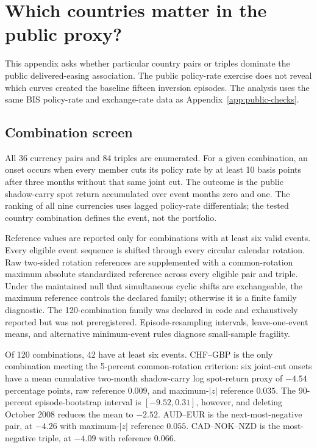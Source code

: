\section{Which countries matter in the public proxy?}
\label{app:country-combinations}

This appendix asks whether particular country pairs or triples dominate the public delivered-easing association. The public policy-rate exercise does not reveal which curves created the baseline fifteen inversion episodes. The analysis uses the same BIS policy-rate and exchange-rate data as Appendix~\ref{app:public-checks}.

\subsection{Combination screen}

All 36 currency pairs and 84 triples are enumerated. For a given combination, an onset occurs when every member cuts its policy rate by at least 10 basis points after three months without that same joint cut. The outcome is the public shadow-carry spot return accumulated over event months zero and one. The ranking of all nine currencies uses lagged policy-rate differentials; the tested country combination defines the event, not the portfolio.

Reference values are reported only for combinations with at least six valid events. Every eligible event sequence is shifted through every circular calendar rotation. Raw two-sided rotation references are supplemented with a common-rotation maximum absolute standardized reference across every eligible pair and triple. Under the maintained null that simultaneous cyclic shifts are exchangeable, the maximum reference controls the declared family; otherwise it is a finite family diagnostic. The 120-combination family was declared in code and exhaustively reported but was not preregistered. Episode-resampling intervals, leave-one-event means, and alternative minimum-event rules diagnose small-sample fragility.



Of 120 combinations, 42 have at least six events. CHF--GBP is the only combination meeting the 5-percent common-rotation criterion: six joint-cut onsets have a mean cumulative two-month shadow-carry log spot-return proxy of $-4.54$ percentage points, raw reference $0.009$, and maximum-$|z|$ reference $0.035$. The 90-percent episode-bootstrap interval is $[-9.52,0.31]$, however, and deleting October 2008 reduces the mean to $-2.52$. AUD--EUR is the next-most-negative pair, at $-4.26$ with maximum-$|z|$ reference $0.055$. CAD--NOK--NZD is the most-negative triple, at $-4.09$ with reference $0.066$.

